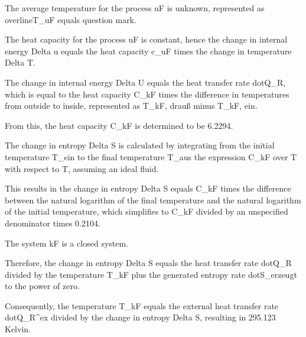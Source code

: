 The average temperature for the process uF is unknown, represented as overline{T}_{uF} equals question mark.

The heat capacity for the process uF is constant, hence the change in internal energy Delta u equals the heat capacity c_{uF} times the change in temperature Delta T.

The change in internal energy Delta U equals the heat transfer rate dot{Q}_R, which is equal to the heat capacity C_{kF} times the difference in temperatures from outside to inside, represented as T_{kF, drauß} minus T_{kF, ein}.

From this, the heat capacity C_{kF} is determined to be 6.2294.

The change in entropy Delta S is calculated by integrating from the initial temperature T_{ein} to the final temperature T_{aus} the expression C_{kF} over T with respect to T, assuming an ideal fluid.

This results in the change in entropy Delta S equals C_{kF} times the difference between the natural logarithm of the final temperature and the natural logarithm of the initial temperature, which simplifies to C_{kF} divided by an unspecified denominator times 0.2104.

The system kF is a closed system.

Therefore, the change in entropy Delta S equals the heat transfer rate dot{Q}_R divided by the temperature T_{kF} plus the generated entropy rate dot{S}_{erzeugt} to the power of zero.

Consequently, the temperature T_{kF} equals the external heat transfer rate dot{Q}_R^{ex} divided by the change in entropy Delta S, resulting in 295.123 Kelvin.